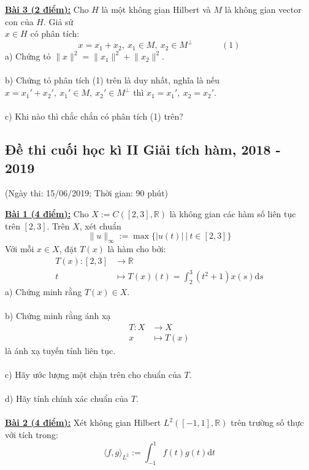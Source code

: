 \documentclass[10pt, a4paper]{article}
\begin{document}
\color{red}\underline{\textbf{Bài 3 (2 điểm):}} \color{black}Cho $H$ là một không gian Hilbert và $M$ là không gian vector con của $H$. Giả sử\\ $x\in H$ có phân tích: $$x=x_1+x_2,~x_1\in M,~x_2\in M^\perp~~~~~~~~~~~~~~~(1)$$
\color{red}a) \color{black}Chứng tỏ $\lVert x\rVert^2=\lVert x_1\rVert^2+\lVert x_2\rVert^2$.\\\\
\color{red}b) \color{black}Chứng tỏ phân tích (1) trên là duy nhất, nghĩa là nếu $x=x_1'+x_2',~x_1'\in M,~x_2'\in M^\perp$ thì $x_1=x_1',~x_2=x_2'$.\\\\
\color{red}c) \color{black}Khi nào thì chắc chắn có phân tích (1) trên?

\newpage

\subsection{Đề thi cuối học kì II Giải tích hàm, 2018 - 2019}
\begin{center}
	\color{blue}(Ngày thi: 15/06/2019; Thời gian: 90 phút)
\end{center}
\color{red}\underline{\textbf{Bài 1 (4 điểm):}} \color{black}Cho $X:=C([2,3],\mathbb R)$ là không gian các hàm số liên tục trên $[2,3]$. Trên $X$, xét chuẩn $$\lVert u\rVert_\infty:=\max\{|u(t)|~|~t\in[2,3]\}$$
Với mỗi $x\in X$, đặt $T(x)$ là hàm cho bởi:\begin{align*}
	T(x):[2,3]&\rightarrow\mathbb R\\
	t&\mapsto T(x)(t)=\displaystyle\int_2^3\left(t^2+1\right)x(s)\text{d}s
\end{align*}
\color{red}a) \color{black}Chứng minh rằng $T(x)\in X$.\\\\
\color{red}b) \color{black}Chứng minh rằng ánh xạ \begin{align*}
	T:X&\rightarrow X\\
	x&\mapsto T(x)
\end{align*} là ánh xạ tuyến tính liên tục.\\\\
\color{red}c) \color{black}Hãy ước lượng một chặn trên cho chuẩn của $T$.\\\\
\color{red}d) \color{black}Hãy tính chính xác chuẩn của $T$.\\\\
\color{red}\underline{\textbf{Bài 2 (4 điểm):}} \color{black}Xét không gian Hilbert $L^2([-1,1],\mathbb R)$ trên trường số thực với tích trong: $$\langle f,g\rangle_{L^2}:=\displaystyle\int_{-1}^1f(t)g(t)\text{d}t$$
\end{document}
